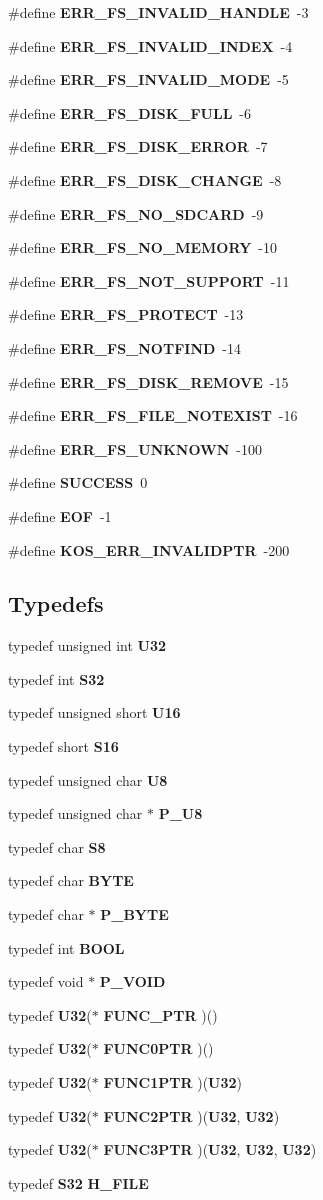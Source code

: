 \begin{CompactItemize}
\item 
\#define {\bf ERR\_\-FS\_\-INVALID\_\-HANDLE}\ -3
\item 
\#define {\bf ERR\_\-FS\_\-INVALID\_\-INDEX}\ -4
\item 
\#define {\bf ERR\_\-FS\_\-INVALID\_\-MODE}\ -5
\item 
\#define {\bf ERR\_\-FS\_\-DISK\_\-FULL}\ -6
\item 
\#define {\bf ERR\_\-FS\_\-DISK\_\-ERROR}\ -7
\item 
\#define {\bf ERR\_\-FS\_\-DISK\_\-CHANGE}\ -8
\item 
\#define {\bf ERR\_\-FS\_\-NO\_\-SDCARD}\ -9
\item 
\#define {\bf ERR\_\-FS\_\-NO\_\-MEMORY}\ -10
\item 
\#define {\bf ERR\_\-FS\_\-NOT\_\-SUPPORT}\ -11
\item 
\#define {\bf ERR\_\-FS\_\-PROTECT}\ -13
\item 
\#define {\bf ERR\_\-FS\_\-NOTFIND}\ -14
\item 
\#define {\bf ERR\_\-FS\_\-DISK\_\-REMOVE}\ -15
\item 
\#define {\bf ERR\_\-FS\_\-FILE\_\-NOTEXIST}\ -16
\item 
\#define {\bf ERR\_\-FS\_\-UNKNOWN}\ -100
\item 
\#define {\bf SUCCESS}\ 0
\item 
\#define {\bf EOF}\ -1
\item 
\#define {\bf KOS\_\-ERR\_\-INVALIDPTR}\ -200
\end{CompactItemize}
\subsection*{Typedefs}
\begin{CompactItemize}
\item 
typedef unsigned int {\bf U32}
\item 
typedef int {\bf S32}
\item 
typedef unsigned short {\bf U16}
\item 
typedef short {\bf S16}
\item 
typedef unsigned char {\bf U8}
\item 
typedef unsigned char $\ast$ {\bf P\_\-U8}
\item 
typedef char {\bf S8}
\item 
typedef char {\bf BYTE}
\item 
typedef char $\ast$ {\bf P\_\-BYTE}
\item 
typedef int {\bf BOOL}
\item 
typedef void $\ast$ {\bf P\_\-VOID}
\item 
typedef {\bf U32}($\ast$ {\bf FUNC\_\-PTR} )()
\item 
typedef {\bf U32}($\ast$ {\bf FUNC0PTR} )()
\item 
typedef {\bf U32}($\ast$ {\bf FUNC1PTR} )({\bf U32})
\item 
typedef {\bf U32}($\ast$ {\bf FUNC2PTR} )({\bf U32}, {\bf U32})
\item 
typedef {\bf U32}($\ast$ {\bf FUNC3PTR} )({\bf U32}, {\bf U32}, {\bf U32})
\item 
typedef {\bf S32} {\bf H\_\-FILE}
\end{CompactItemize}
